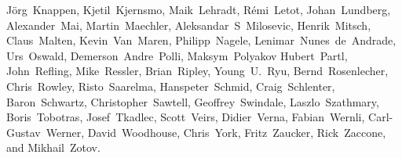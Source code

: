 {J\"org~Knappen,         %
Kjetil~Kjernsmo,        %
Maik~Lehradt,           %
R\'emi~Letot,           %
Johan~Lundberg,         %
Alexander~Mai,          %
Martin~Maechler,        %
Aleksandar~S~Milosevic, %
Henrik~Mitsch,          %
Claus~Malten,           %
Kevin~Van~Maren,        %
Philipp~Nagele,         %
Lenimar~Nunes~de~Andrade, %
Urs~Oswald,             %
Demerson~Andre~Polli,   %
Maksym~Polyakov         %
Hubert~Partl,           %
John~Refling,           %
Mike~Ressler,           %
Brian~Ripley,           %
Young~U.~Ryu,           %
Bernd~Rosenlecher,      %
Chris~Rowley,           %
Risto~Saarelma,         %
Hanspeter~Schmid,       %
Craig~Schlenter,        %
Baron~Schwartz,         %
Christopher~Sawtell,    %
Geoffrey~Swindale,      %
Laszlo~Szathmary,       %
Boris~Tobotras,         %
Josef~Tkadlec,          %
Scott~Veirs,            %
Didier~Verna,           %
Fabian~Wernli,          %
Carl-Gustav~Werner,     %
David~Woodhouse,        %
Chris~York,             %
Fritz~Zaucker,          %
Rick~Zaccone,           %
and Mikhail~Zotov.      %

}




\pagebreak
\endinput
%

